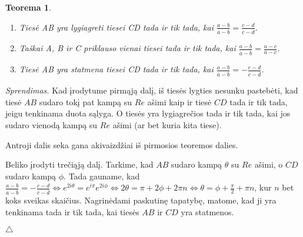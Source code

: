 \documentclass[11pt,a4paper,twoside]{book}
\newenvironment{sprendimas}{\noindent \textit{Sprendimas.}}{\hfill $\triangle$}
\newtheorem{thmnr}{Teorema}
\theoremstyle{definition} \newtheorem*{api}{Apibrėžimas}
\theoremstyle{remark} \newtheorem*{pastaba}{Pastaba}
\begin{document}
\begin{thmnr}\
\begin{enumerate}
\item Tiesė AB yra lygiagreti tiesei CD tada ir tik tada, kai $\frac{a - b}{\overline{a} -\overline{b}}=\frac{c - d}{\overline{c} - \overline{d}}$.
\item Taškai A, B ir C priklauso vienai tiesei tada ir tik tada, kai $\frac{a - b}{\overline{a} -\overline{b}}=\frac{a-c}{\overline{a} - \overline{c}}$.
\item Tiesė AB yra statmena tiesei CD tada ir tik tada, kai $\frac{a - b}{\overline{a} -\overline{b}}=-\frac{c - d}{\overline{c} - \overline{d}}$.
\end{enumerate}
\end{thmnr}
\begin{sprendimas} Kad įrodytume pirmąją dalį, iš tiesės lygties nesunku pastebėti, kad tiesė $AB$ sudaro tokį pat kampą su $Re$ ašimi kaip ir tiesė $CD$ tada ir tik tada, jeigu tenkinama duota sąlyga. O tiesės yra lygiagrečios tada ir tik tada, kai jos sudaro vienodą kampą su $Re$ ašimi (ar bet kuria kita tiese).

Antroji dalis seka gana akivaizdžiai iš pirmosios teoremos dalies.

Beliko įrodyti trečiąją dalį. Tarkime, kad $AB$ sudaro kampą $\theta$ su $Re$ ašimi, o $CD$ sudaro kampą $\phi$. Tada gauname, kad $\frac{a - b}{\overline{a} -\overline{b}}=-\frac{c - d}{\overline{c} - \overline{d}} \Leftrightarrow e^{2i\theta}=e^{i\pi}e^{2i\phi} \Leftrightarrow 2\theta = \pi + 2\phi + 2\pi n \Leftrightarrow \theta = \phi + \frac{\pi}{2} + \pi n $, kur $n$ bet koks sveikas skaičius. Nagrinėdami paskutinę tapatybę, matome, kad ji yra tenkinama tada ir tik tada, kai tiesės $AB$ ir $CD$ yra statmenos.

\end{sprendimas}
\end{document}
